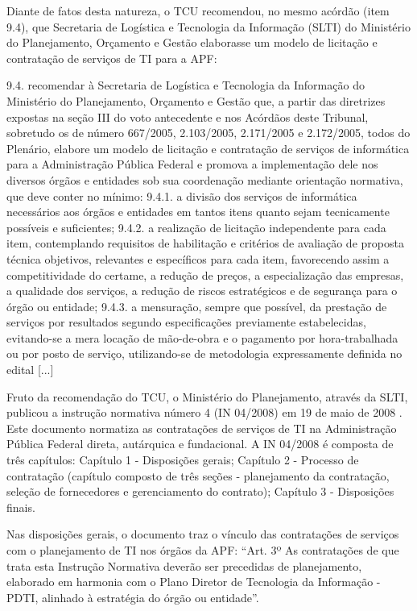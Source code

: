 Diante de fatos desta natureza, o TCU recomendou, no mesmo acórdão (item 9.4), que Secretaria de Logística e Tecnologia da Informação (SLTI) do Ministério do Planejamento, Orçamento e Gestão elaborasse um modelo de licitação e contratação de serviços de TI para a APF:
\begin{citacao}
9.4. recomendar à Secretaria de Logística e Tecnologia da Informação do Ministério do Planejamento, Orçamento e Gestão que, a partir das diretrizes expostas na seção III do voto antecedente e nos Acórdãos deste Tribunal, sobretudo os de número 667/2005, 2.103/2005, 2.171/2005 e 2.172/2005, todos do Plenário, elabore um modelo de licitação e contratação de serviços de informática para a Administração Pública Federal e promova a implementação dele nos diversos órgãos e entidades sob sua coordenação mediante orientação normativa, que deve conter no mínimo:
9.4.1. a divisão dos serviços de informática necessários aos órgãos e entidades em tantos itens quanto sejam tecnicamente possíveis e suficientes;
9.4.2. a realização de licitação independente para cada item, contemplando requisitos de habilitação e critérios de avaliação de proposta técnica objetivos, relevantes e específicos para cada item, favorecendo assim a competitividade do certame, a redução de preços, a especialização das empresas, a qualidade dos serviços, a redução de riscos estratégicos e de segurança para o órgão ou entidade;
9.4.3. a mensuração, sempre que possível, da prestação de serviços por resultados segundo especificações previamente estabelecidas, evitando-se a mera locação de mão-de-obra e o pagamento por hora-trabalhada ou por posto de serviço, utilizando-se de metodologia expressamente definida no edital [...]
\end{citacao}

Fruto da recomendação do TCU, o Ministério do Planejamento, através da SLTI, publicou a instrução normativa número 4 (IN 04/2008) em 19 de maio de 2008 \cite{in04:08}. Este documento normatiza as contratações de serviços de TI na Administração Pública Federal direta, autárquica e fundacional. A IN 04/2008 é composta de três capítulos: Capítulo 1 - Disposições gerais; Capítulo 2 - Processo de contratação (capítulo composto de três seções -  planejamento da contratação, seleção de fornecedores e gerenciamento do contrato); Capítulo 3 - Disposições finais.

Nas disposições gerais, o documento traz o vínculo das contratações de serviços com o planejamento de TI nos órgãos da APF: ``Art. 3º As contratações de que trata esta Instrução Normativa deverão ser precedidas de planejamento, elaborado em harmonia com o Plano Diretor de Tecnologia da Informação - PDTI, alinhado à estratégia do órgão ou entidade''.

